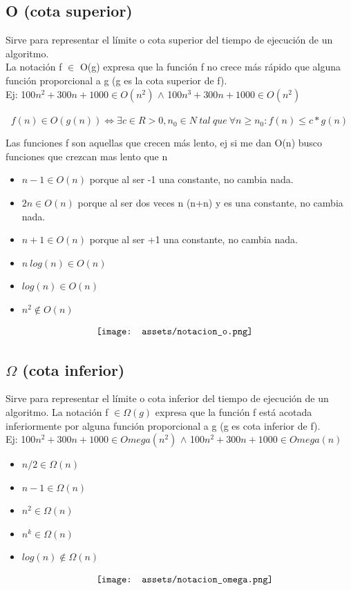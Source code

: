 \documentclass[10pt,a4paper]{article}
\begin{document}
\subsection*{O (cota superior)}
Sirve para representar el límite o cota superior del tiempo de ejecución de un algoritmo. \\
La notación f \(\in\) O(g) expresa que la función f no crece más rápido que alguna función proporcional a g (g es la cota superior de f). \\
Ej: 100\(n^{2} + 300n + 1000 \in O(n^{2})\) \(\land\) 100\(n^{3} + 300n + 1000 \in O(n^{2})\) \\ \\

\[ f (n) \in O(g(n)) \iff \exists c \in R>0, n_{0} \in N \ tal \ que \
\forall n \ge n_{0} : f (n) \le c \ast g(n) \]

Las funciones f son aquellas que crecen más lento, ej si me dan O(n) busco funciones que crezcan mas lento que n
\begin{itemize}
    \item \(n-1 \in O(n) \) porque al ser -1 una constante, no cambia nada.
    \item \(2n \in O(n)\) porque al ser dos veces n (n+n) y es una constante, no cambia nada.
    \item \(n+1 \in O(n)\)  porque al ser +1 una constante, no cambia nada.
    \item \(n\ log(n) \in O(n)\)
    \item \(log(n) \in O(n)\)
    \item \(n^{2} \notin O(n)\)
\end{itemize}
\[\begin{minipage}[b]{0.5\textwidth}
    \texttt{[image: assets/notacion\_o.png]}
\end{minipage}\]
\subsection*{\(\Omega\) (cota inferior)}
Sirve para representar el límite o cota inferior del tiempo de ejecución de un algoritmo.
La notación f \(\in \Omega(g)\) expresa que la función f está acotada inferiormente por alguna función proporcional a g (g es cota inferior de f). \\
Ej: 100\(n^{2} + 300n + 1000 \in Omega(n^{2})\) \(\land\) 100\(n^{2} + 300n + 1000 \in Omega(n)\)
\begin{itemize}
    \item \(n/2 \in \Omega(n)\)
    \item \(n-1 \in \Omega(n)\)
    \item \(n^{2} \in \Omega(n)\)
    \item \(n^{k} \in \Omega(n)\) 
    \item \(log(n) \notin \Omega(n)\) 
\end{itemize}
\[\begin{minipage}[b]{0.5\textwidth}
    \texttt{[image: assets/notacion\_omega.png]}
\end{minipage}\]
\end{document}
